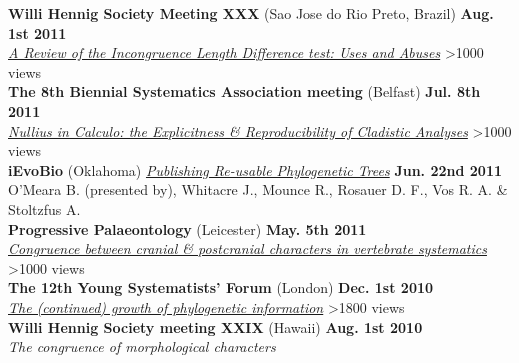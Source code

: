 \documentclass[margin,line]{resume}
\begin{document}
\begin{resume}
\vspace{-7 mm} 
    \textbf{Willi Hennig Society Meeting XXX} (Sao Jose do Rio Preto, Brazil) \hfill \textbf{Aug. 1st 2011}\\
    \textsl{\href{http://prezi.com/prj21wcwdlx5/ild-review/}{A Review of the Incongruence Length Difference test: Uses and Abuses}} \hfill {\color{red} \textgreater1000 views}\\

\vspace{-7 mm} 
    \textbf{The 8th Biennial Systematics Association meeting} (Belfast)
 \hfill \textbf{Jul. 8th 2011}\\
    \textsl{\href{http://prezi.com/rwyvfb9bvec_/nullius-in-calculo/}{Nullius in Calculo: the Explicitness \& Reproducibility of Cladistic Analyses}}\hfill {\color{red} \textgreater 1000 views}\\

\vspace{-7 mm} 
    \textbf{iEvoBio} (Oklahoma) \textsl{\href{http://dx.doi.org/10.1038/npre.2011.6048.1}{Publishing Re-usable Phylogenetic Trees}} \hfill \textbf{Jun. 22nd 2011}\\
    O'Meara B. (presented by), Whitacre J., Mounce R., Rosauer D. F., Vos R. A. \& Stoltzfus A.\\

\vspace{-7 mm} 
\textbf{Progressive Palaeontology} (Leicester)
 \hfill \textbf{May. 5th 2011}\\
    \textsl{\href{http://www.slideshare.net/rossmounce/progpal2011}{Congruence between cranial \& postcranial characters in vertebrate systematics}}\hfill {\color{red} \textgreater 1000 views}\\

\vspace{-7 mm} 
\textbf{The 12th Young Systematists' Forum} (London)
 \hfill \textbf{Dec. 1st 2010}\\
    \textsl{\href{http://prezi.com/1s0lkatmc30t/the-continued-growth-of-phylogenetic-information/}{The (continued) growth of phylogenetic information}}\hfill {\color{red} \textgreater 1800 views}\\

\vspace{-7 mm} 
\textbf{Willi Hennig Society meeting XXIX} (Hawaii)
 \hfill \textbf{Aug. 1st 2010}\\
    \textsl{The congruence of morphological characters}\\


\end{resume}
\end{document}
